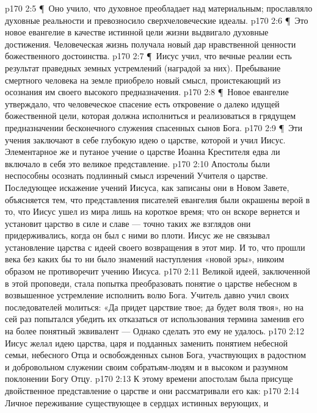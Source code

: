 \vs p170 2:5 \P\ \bibnobreakspace Оно учило, что духовное преобладает над материальным; прославляло духовные реальности и превозносило сверхчеловеческие идеалы.
\vs p170 2:6 \P\ \bibnobreakspace Это новое евангелие в качестве истинной цели жизни выдвигало духовные достижения. Человеческая жизнь получала новый дар нравственной ценности божественного достоинства.
\vs p170 2:7 \P\ \bibnobreakspace Иисус учил, что вечные реалии есть результат праведных земных устремлений (наградой за них). Пребывание смертного человека на земле приобрело новый смысл, проистекающий из осознания им своего высокого предназначения.
\vs p170 2:8 \P\ \bibnobreakspace Новое евангелие утверждало, что человеческое спасение есть откровение о далеко идущей божественной цели, которая должна исполниться и реализоваться в грядущем предназначении бесконечного служения спасенных сынов Бога.
\vs p170 2:9 \P\ Эти учения заключают в себе глубокую идею о царстве, которой и учил Иисус. Элементарное же и путаное учение о царстве Иоанна Крестителя едва ли включало в себя это великое представление.
\vs p170 2:10 Апостолы были неспособны осознать подлинный смысл изречений Учителя о царстве. Последующее искажение учений Иисуса, как записаны они в Новом Завете, объясняется тем, что представления писателей евангелия были окрашены верой в то, что Иисус ушел из мира лишь на короткое время; что он вскоре вернется и установит царство в силе и славе --- точно таких же взглядов они придерживались, когда он был с ними во плоти. Иисус же не связывал установление царства с идеей своего возвращения в этот мир. И то, что прошли века без каких бы то ни было знамений наступления «новой эры», никоим образом не противоречит учению Иисуса.
\vs p170 2:11 Великой идеей, заключенной в этой проповеди, стала попытка преобразовать понятие о царстве небесном в возвышенное устремление исполнить волю Бога. Учитель давно учил своих последователей молиться: «Да придет царствие твое; да будет воля твоя», но на сей раз попытался убедить их отказаться от использования термина  заменив его на более понятный эквивалент ---  Однако сделать это ему не удалось.
\vs p170 2:12 Иисус желал идею царства, царя и подданных заменить понятием небесной семьи, небесного Отца и освобожденных сынов Бога, участвующих в радостном и добровольном служении своим собратьям\hyp{}людям и в высоком и разумном поклонении Богу Отцу.
\vs p170 2:13 К этому времени апостолам была присуще двойственное представление о царстве и они рассматривали его как:
\vs p170 2:14 \bibnobreakspace Личное переживание существующее в сердцах истинных верующих, и
